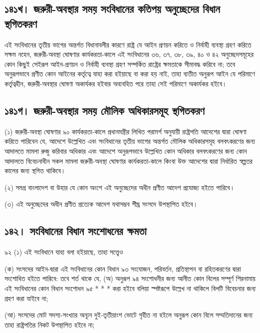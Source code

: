 \documentclass[11pt]{article}
\begin{document}
\subsection{১৪১খ। জরুরী-অবস্থার সময় সংবিধানের কতিপয় অনুচ্ছেদের বিধান স্থগিতকরণ}
\label{sec:orgf30df53}
এই সংবিধানের তৃতীয় ভাগের অন্তর্গত বিধানাবলীর কারণে রাষ্ট্র যে আইন প্রণয়ন
করিতে ও নির্বাহী ব্যবস্থা গ্রহণ করিতে সক্ষম নহেন, জরুরী-অবস্থা ঘোষণার
কার্যকরতা-কালে এই সংবিধানের ৩৬, ৩৭, ৩৮, ৩৯, ৪০ ও ৪২ অনুচ্ছেদসমূহের কোন
কিছুই সেইরূপ আইন-প্রণয়ন ও নির্বাহী ব্যবস্থা গ্রহণ সম্পর্কিত রাষ্ট্রের ক্ষমতাকে
সীমাবদ্ধ করিবে না; তবে অনুরূপভাবে প্রণীত কোন আইনের কর্তৃত্বে যাহা করা হইয়াছে
বা করা হয় নাই, তাহা ব্যতীত অনুরূপ আইন যে পরিমাণে কর্তৃত্বহীন, জরুরী-অবস্থার
ঘোষণা অকার্যকর হইবার অব্যবহিত পরে তাহা সেই পরিমাণে অকার্যকর হইবে।

\subsection{১৪১গ। জরুরী-অবস্থার সময় মৌলিক অধিকারসমূহ স্থগিতকরণ}
\label{sec:org5bc44a2}
(১) জরুরী-অবস্থা ঘোষণার ৯০ কার্যকরতা-কালে প্রধানমন্ত্রীর লিখিত পরামর্শ অনুযায়ী
    রাষ্ট্রপতি আদেশের দ্বারা ঘোষণা করিতে পারিবেন যে, আদেশে উল্লেখিত এবং
    সংবিধানের তৃতীয় ভাগের অন্তর্গত মৌলিক অধিকারসমূহ বলবৎকরণের জন্য আদালতে
    মামলা রুজু করিবার অধিকার এবং আদেশে অনুরূপভাবে উল্লেখিত কোন অধিকার বলবৎকরণের
    জন্য কোন আদালতে বিবেচনাধীন সকল মামলা জরুরী-অবস্থা ঘোষণার কার্যকরতা-কালে
    কিংবা উক্ত আদেশের দ্বারা নির্ধারিত স্বল্পতর কালের জন্য স্থগিত থাকিবে।

(২) সমগ্র বাংলাদেশ বা উহার যে কোন অংশে এই অনুচ্ছেদের অধীন প্রণীত আদেশ
    প্রযোজ্য হইতে পারিবে।

(৩) এই অনুচ্ছেদের অধীন প্রণীত প্রত্যেক আদেশ যথাসম্ভব শীঘ্র সংসদে উপস্থাপিত
    হইবে।

\subsection{১৪২। সংবিধানের বিধান সংশোধনের ক্ষমতা}
\label{sec:org0f12b86}

৯২ (১) এই সংবিধানে যাহা বলা হইয়াছে, তাহা সত্ত্বেও

(ক) সংসদের আইন-দ্বারা এই সংবিধানের কোন বিধান ৯৩ সংযোজন, পরিবর্তন,
    প্রতিস্থাপন বা রহিতকরণের দ্বারা সংশোধিত হইতে পারিবে:
    তবে শর্ত থাকে যে,
    (অ) অনুরূপ ৯৪ সংশোধনীর জন্য আনীত কোন বিলের সম্পূর্ণ শিরনামায় এই সংবিধানের
    কোন বিধান সংশোধন ৯৫ * * * করা হইবে বলিয়া স্পষ্টরূপে উল্লেখ না থাকিলে বিলটি
    বিবেচনার জন্য গ্রহণ করা যাইবে না;

(আ) সংসদের মোট সদস্য-সংখ্যার অন্যূন দুই-তৃতীয়াংশ ভোটে গৃহীত না হইলে অনুরূপ কোন
বিলে সম্মতিদানের জন্য তাহা রাষ্ট্রপতির নিকট উপস্থাপিত হইবে না;
\end{document}
